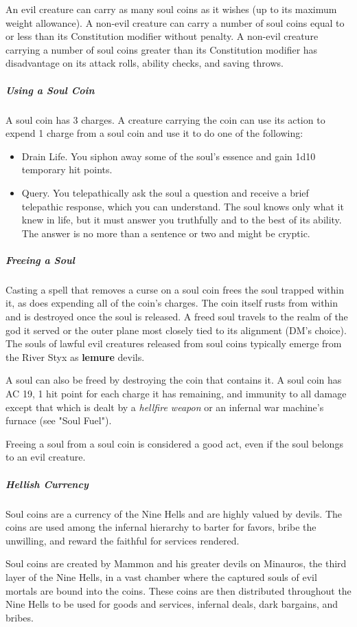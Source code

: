 \documentclass[10pt,a4paper,twoside,bg=print,twocolumn,openany,nodeprecatedcode]{dndbook}
\begin{document}
An evil creature can carry as many soul coins as it wishes (up to its maximum weight allowance). A non-evil creature can carry a number of soul coins equal to or less than its Constitution modifier without penalty. A non-evil creature carrying a number of soul coins greater than its Constitution modifier has disadvantage on its attack rolls, ability checks, and saving throws.

\subparagraph{Using a Soul Coin}
A soul coin has 3 charges. A creature carrying the coin can use its action to expend 1 charge from a soul coin and use it to do one of the following:


\begin{itemize}
\item{Drain Life.}
You siphon away some of the soul's essence and gain 1d10 temporary hit points.
\item{Query.}
You telepathically ask the soul a question and receive a brief telepathic response, which you can understand. The soul knows only what it knew in life, but it must answer you truthfully and to the best of its ability. The answer is no more than a sentence or two and might be cryptic.
\end{itemize}

\subparagraph{Freeing a Soul}
Casting a spell that removes a curse on a soul coin frees the soul trapped within it, as does expending all of the coin's charges. The coin itself rusts from within and is destroyed once the soul is released. A freed soul travels to the realm of the god it served or the outer plane most closely tied to its alignment (DM's choice). The souls of lawful evil creatures released from soul coins typically emerge from the River Styx as \textbf{lemure} devils.

A soul can also be freed by destroying the coin that contains it. A soul coin has AC 19, 1 hit point for each charge it has remaining, and immunity to all damage except that which is dealt by a \textit{hellfire weapon} or an infernal war machine's furnace (see "Soul Fuel").

Freeing a soul from a soul coin is considered a good act, even if the soul belongs to an evil creature.

\subparagraph{Hellish Currency}
Soul coins are a currency of the Nine Hells and are highly valued by devils. The coins are used among the infernal hierarchy to barter for favors, bribe the unwilling, and reward the faithful for services rendered.

Soul coins are created by Mammon and his greater devils on Minauros, the third layer of the Nine Hells, in a vast chamber where the captured souls of evil mortals are bound into the coins. These coins are then distributed throughout the Nine Hells to be used for goods and services, infernal deals, dark bargains, and bribes.
\end{document}
